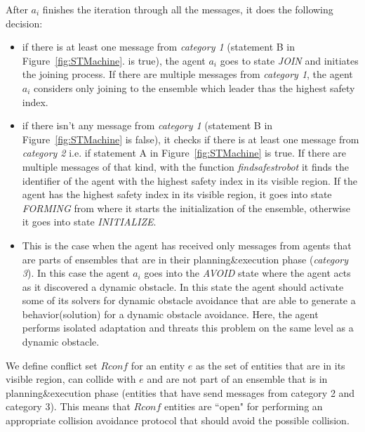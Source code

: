 \documentclass[journal]{IEEEtran}
\theoremstyle{definition}
\newcommand{\ugh}[1]{\textcolor{red}{\uwave{#1}}} %
\begin{document}
After $a_i$ finishes the iteration through all the messages, it does the following decision:
\begin{itemize}
\item if there is at least one message from \textit{category 1} 
(statement B in Figure~\ref{fig:STMachine}. is true), the agent $a_i$ goes to state \textit{JOIN} and initiates the joining process. 
If there are multiple messages from \textit{category 1}, the agent $a_i$ considers only joining to the ensemble which leader thas the highest safety index.  
\item %
if there isn't any message from \textit{category 1} (statement B in Figure~\ref{fig:STMachine} is false), it checks if there is at least one message from \textit{category 2} i.e.
if statement A in Figure~\ref{fig:STMachine} is true. If there are multiple messages of that kind, with the function \textit{findsafestrobot} it finds the identifier of the agent with the highest safety index in its visible region. If the agent has the highest safety index in its visible region, it goes into state \textit{FORMING} from where it starts the initialization of the ensemble, otherwise it goes into state \textit{INITIALIZE}.
\item This is the case when the agent has received only messages from agents that are parts of ensembles that are in their planning\&execution phase (\textit{category 3}). In this case the agent $a_i$ goes into the \textit{AVOID} state where the agent acts as it discovered a dynamic obstacle. In this state the agent should activate some of its solvers for dynamic obstacle avoidance that are able to generate a behavior(solution) for a dynamic obstacle avoidance. Here, the agent performs isolated adaptation and threats this problem on the same level as a dynamic obstacle.
\end{itemize}

We define conflict set $Rconf$ for an entity $e$ as the set of entities that are in its visible region, can collide with $e$ and are not part of an ensemble that is in planning\&execution phase (entities that have send messages from category 2 and category 3). This means that $Rconf$ entities are ``open" for performing an appropriate collision avoidance protocol that should avoid the possible collision.
\end{document}
